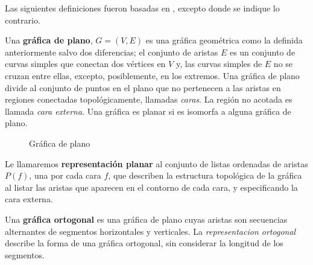 Las siguientes definiciones fueron basadas en \cite{tamassia}, excepto donde se indique lo contrario.

\begin{definition}
Una \textbf{gr\'afica de plano}, $G=(V, E)$ es una gr\'afica geom\'etrica como la definida anteriormente salvo dos diferencias; el conjunto de aristas $E$ es un conjunto de curvas simples que conectan dos v\'ertices en $V$ y, las curvas simples de $E$ no se cruzan entre ellas, excepto, posiblemente, en los extremos. Una gr\'afica de plano divide al conjunto de puntos en el plano que no pertenecen a las aristas en regiones conectadas topológicamente, llamadas \emph{caras}. La región no acotada es llamada \emph{cara externa}. Una gr\'afica es planar si es isomorfa a alguna gr\'afica de plano.
\end{definition}

\begin{figure}
  \caption{Gr\'afica de plano}
\end{figure}

\begin{definition}
Le llamaremos \textbf{representaci\'on planar} al conjunto de listas ordenadas de aristas $P(f)$, una por cada cara $f$, que describen la estructura topol\'ogica de la gr\'afica al listar las aristas que aparecen en el contorno de cada cara, y especificando la cara externa.
\end{definition}

\begin{definition}
Una \textbf{gr\'afica ortogonal} es una gr\'afica de plano cuyas aristas son secuencias alternantes de segmentos horizontales y verticales. La \emph{representacion ortogonal} describe la forma de una gr\'afica ortogonal, sin considerar la longitud de los segmentos.
\end{definition}

